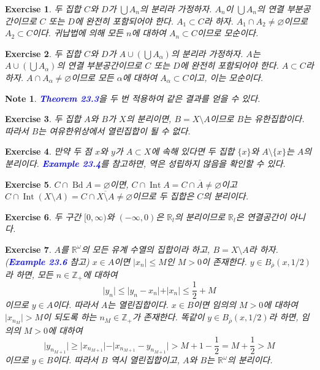 \documentclass{article}
\newtheorem{exercise}{Exercise}[section]
\newtheorem*{note}{Note}
\newcommand{\R}{\mathbb{R}}
\newcommand{\Z}{\mathbb{Z}}
\begin{document}
\begin{exercise}
    두 집합 $C$와 $D$가 $\bigcup A_n$의 분리라 가정하자. $A_n$이 $\bigcup A_n$의 연결 부분공간이므로 $C$ 또는 $D$에 완전히 포함되어야 한다. $A_1\subset C$라 하자. $A_1\cap A_2\ne\varnothing$이므로 $A_2\subset C$이다. 귀납법에 의해 모든 $n$에 대하여 $A_n\subset C$이므로 모순이다.
\end{exercise}

\begin{exercise}
    두 집합 $C$와 $D$가 $A\cup(\bigcup A_\alpha)$의 분리라 가정하자. $A$는 $A\cup(\bigcup A_\alpha)$의 연결 부분공간이므로 $C$ 또는 $D$에 완전히 포함되어야 한다. $A\subset C$라 하자. $A\cap A_\alpha\ne\varnothing$이므로 모든 $\alpha$에 대하여 $A_\alpha\subset C$이고, 이는 모순이다. 
\end{exercise}
\begin{note}
    \textcolor{blue}{\textbf{Theorem 23.3}}을 두 번 적용하여 같은 결과를 얻을 수 있다.
\end{note}

\begin{exercise}
    두 집합 $A$와 $B$가 $X$의 분리이면, $B=X\setminus A$이므로 $B$는 유한집합이다. 따라서 $B$는 여유한위상에서 열린집합이 될 수 없다.
\end{exercise}

\begin{exercise}
    만약 두 점 $x$와 $y$가 $A\subset X$에 속해 있다면 두 집합 $\{x\}$와 $A\setminus\{x\}$는 $A$의 분리이다. \textcolor{blue}{\textbf{Example 23.4}}를 참고하면, 역은 성립하지 않음을 확인할 수 있다.
\end{exercise}

\begin{exercise}
    $C\cap\operatorname{Bd}A=\varnothing$이면, $C\cap\operatorname{Int}A=C\cap\overline{A}\ne\varnothing$이고 $C\cap\operatorname{Int}(X\setminus A)=C\cap \overline{X\setminus A}\ne\varnothing$이므로 두 집합은 $C$의 분리이다.
\end{exercise}

\begin{exercise}
    두 구간 $[0,\infty)$와 $(-\infty,0)$은 $\R_l$의 분리이므로 $\R_l$은 연결공간이 아니다.
\end{exercise}

\begin{exercise}
	\label{exc:23.8}
    $A$를 $\R^\omega$의 모든 유계 수열의 집합이라 하고, $B=X\setminus A$라 하자. (\textcolor{blue}{\textbf{Example 23.6}} 참고) $x\in A$이면 $\vert x_n\vert\leq M$인 $M>0$이 존재한다. $y\in B_{\overline{\rho}}(x,1/2)$라 하면, 모든 $n\in\Z_+$에 대하여
    \[
        \vert y_n\vert\leq\vert y_n-x_n\vert+\vert x_n\vert\leq\frac{1}{2}+M
    \]
    이므로 $y\in A$이다. 따라서 $A$는 열린집합이다. $x\in B$이면 임의의 $M>0$에 대하여 $\vert x_{n_M}\vert>M$이 되도록 하는 $n_M\in\Z_+$가 존재한다. 똑같이 $y\in B_{\overline{\rho}}(x,1/2)$라 하면, 임의의 $M>0$에 대하여
    \[
        \vert y_{n_{M+1}}\vert\geq\vert x_{n_{M+1}}\vert-\vert x_{n_{M+1}}-y_{n_{M+1}}\vert>M+1-\frac{1}{2}=M+\frac{1}{2}>M 
    \]
    이므로 $y\in B$이다. 따라서 $B$ 역시 열린집합이고, $A$와 $B$는 $\R^\omega$의 분리이다.
\end{exercise}
\end{document}
